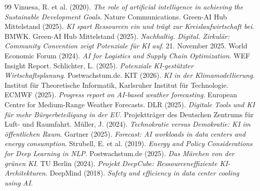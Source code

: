 \documentclass[12pt, a4paper]{article}
\begin{document}
\begin{thebibliography}{99}
		 Vinuesa, R. et al. (2020). \textit{The role of artificial intelligence in achieving the Sustainable Development Goals}. Nature Communications.
		 Green-AI Hub Mittelstand (2025). \textit{KI spart Ressourcen ein und trägt zur Kreislaufwirtschaft bei}. BMWK.
		 Green-AI Hub Mittelstand (2025). \textit{Nachhaltig. Digital. Zirkulär: Community Convention zeigt Potenziale für KI auf}. 21. November 2025.
		 World Economic Forum (2024). \textit{AI for Logistics and Supply Chain Optimization}. WEF Insight Report.
		 Schlichter, L. (2025). \textit{Potenziale KI-gestützter Wirtschaftsplanung}. Postwachstum.de.
		 KIT (2026). \textit{KI in der Klimamodellierung}. Institut für Theoretische Informatik, Karlsruher Institut für Technologie.
		 ECMWF (2025). \textit{Progress report on AI-based weather forecasting}. European Centre for Medium-Range Weather Forecasts.
		 DLR (2025). \textit{Digitale Tools und KI für mehr Bürgerbeteiligung in der EU}. Projektträger des Deutschen Zentrums für Luft- und Raumfahrt.
		 Müller, J. (2024). \textit{Technokratie versus Demokratie: KI im öffentlichen Raum}.
		 Gartner (2025). \textit{Forecast: AI workloads in data centers and energy consumption}.
		 Strubell, E. et al. (2019). \textit{Energy and Policy Considerations for Deep Learning in NLP}.
		 Postwachstum.de (2025). \textit{Das Märchen von der grünen KI}.
		 TU Berlin (2024). \textit{Projekt DeepCube: Ressourceneffiziente KI-Architekturen}.
		 DeepMind (2018). \textit{Safety and efficiency in data center cooling using AI}.
		

\end{thebibliography}
\end{document}
